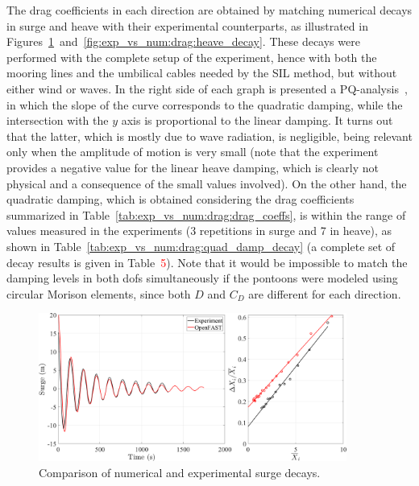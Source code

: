 The drag coefficients in each direction are obtained by matching numerical decays in surge and heave with their experimental counterparts, as illustrated in Figures~\ref{fig:exp_vs_num:drag:surge_decay}~and~\ref{fig:exp_vs_num:drag:heave_decay}. These decays were performed with the complete setup of the experiment, hence with both the mooring lines and the umbilical cables needed by the SIL method, but without either wind or waves. In the right side of each graph is presented a PQ-analysis~\citep{burmester2020}, in which the slope of the curve corresponds to the quadratic damping, while the intersection with the $y$ axis is proportional to the linear damping. It turns out that the latter, which is mostly due to wave radiation, is negligible, being relevant only when the amplitude of motion is very small (note that the experiment provides a negative value for the linear heave damping, which is clearly not physical and a consequence of the small values involved). On the other hand, the quadratic damping, which is obtained considering the drag coefficients summarized in Table~\ref{tab:exp_vs_num:drag:drag_coeffs}, is within the range of values measured in the experiments (3 repetitions in surge and 7 in heave), as shown in Table~\ref{tab:exp_vs_num:drag:quad_damp_decay} (a complete set of decay results is given in Table~\textcolor{red}{5}). Note that it would be impossible to match the damping levels in both dofs simultaneously if the pontoons were modeled using circular Morison elements, since both $D$ and $C_D$ are different for each direction. 
\begin{figure}[!hbtp]
	\centering
	\includegraphics[width=0.9\textwidth]{./figures/surge_decay_drag_pontoon.png}	
	\caption{Comparison of numerical and experimental surge decays.} \label{fig:exp_vs_num:drag:surge_decay}
\end{figure}

